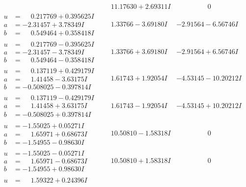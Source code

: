 \documentclass[1p]{elsarticle_modified}
\theoremstyle{definition}
\begin{document}
$$\begin{array}{c|c|c}
 & \phantom{-}11.17630 + 2.69311 I & \phantom{-0.000000 } 0 \\ \hline\begin{aligned}
u &= \phantom{-}0.217769 + 0.395625 I \\
a &= -2.31457 + 3.78349 I \\
b &= \phantom{-}0.549464 + 0.358418 I\end{aligned}
 & \phantom{-}1.33766 - 3.69180 I & -2.91564 - 6.56746 I \\ \hline\begin{aligned}
u &= \phantom{-}0.217769 - 0.395625 I \\
a &= -2.31457 - 3.78349 I \\
b &= \phantom{-}0.549464 - 0.358418 I\end{aligned}
 & \phantom{-}1.33766 + 3.69180 I & -2.91564 + 6.56746 I \\ \hline\begin{aligned}
u &= \phantom{-}0.137119 + 0.429179 I \\
a &= \phantom{-}1.41458 - 3.63175 I \\
b &= -0.508025 - 0.397814 I\end{aligned}
 & \phantom{-}1.61743 + 1.92054 I & -4.53145 - 10.20212 I \\ \hline\begin{aligned}
u &= \phantom{-}0.137119 - 0.429179 I \\
a &= \phantom{-}1.41458 + 3.63175 I \\
b &= -0.508025 + 0.397814 I\end{aligned}
 & \phantom{-}1.61743 - 1.92054 I & -4.53145 + 10.20212 I \\ \hline\begin{aligned}
u &= -1.55025 + 0.05271 I \\
a &= \phantom{-}1.65971 + 0.68673 I \\
b &= -1.54955 - 0.98630 I\end{aligned}
 & \phantom{-}10.50810 - 1.58318 I & \phantom{-0.000000 } 0 \\ \hline\begin{aligned}
u &= -1.55025 - 0.05271 I \\
a &= \phantom{-}1.65971 - 0.68673 I \\
b &= -1.54955 + 0.98630 I\end{aligned}
 & \phantom{-}10.50810 + 1.58318 I & \phantom{-0.000000 } 0 \\ \hline\begin{aligned}
u &= \phantom{-}1.59322 + 0.24396 I \\

\end{aligned}
\end{array}$$
\end{document}
